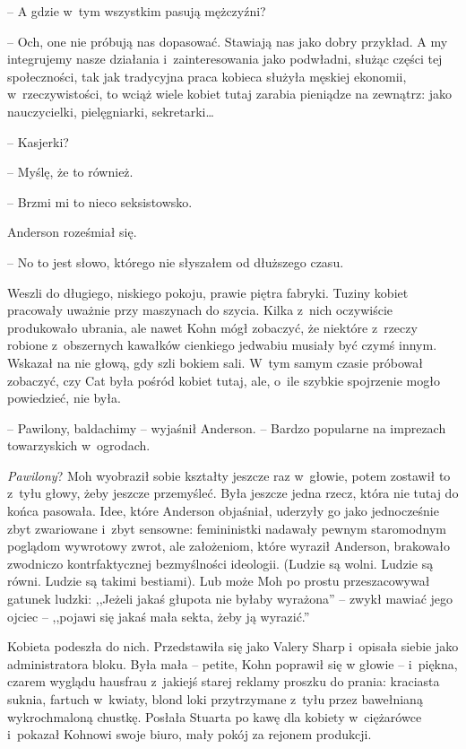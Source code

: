 \documentclass[oneside,polish,11pt,sfheadings]{mwbk}
\begin{document}
-- A gdzie w~tym wszystkim pasują mężczyźni?

-- Och, one nie próbują nas dopasować. Stawiają nas jako dobry przykład.
A my integrujemy nasze działania i~zainteresowania jako podwładni,
służąc części tej społeczności, tak jak tradycyjna praca kobieca służyła
męskiej ekonomii, w~rzeczywistości, to wciąż wiele kobiet tutaj zarabia
pieniądze na zewnątrz: jako nauczycielki, pielęgniarki, sekretarki\ldots

-- Kasjerki?

-- Myślę, że to również.

-- Brzmi mi to nieco seksistowsko.

Anderson roześmiał się. 

-- No to jest słowo, którego nie słyszałem od
dłuższego czasu.

Weszli do długiego, niskiego pokoju, prawie piętra fabryki. Tuziny
kobiet pracowały uważnie przy maszynach do szycia. Kilka z~nich
oczywiście produkowało ubrania, ale nawet Kohn mógł zobaczyć, że
niektóre z~rzeczy robione z~obszernych kawałków cienkiego jedwabiu
musiały być czymś innym. Wskazał na nie głową, gdy szli bokiem sali. W~tym samym czasie próbował zobaczyć, czy Cat była pośród kobiet tutaj,
ale, o~ile szybkie spojrzenie mogło powiedzieć, nie była.

-- Pawilony, baldachimy -- wyjaśnił Anderson. -- Bardzo popularne na
imprezach towarzyskich w~ogrodach.

\emph{Pawilony}? Moh wyobraził sobie kształty jeszcze raz w~głowie,
potem zostawił to z~tyłu głowy, żeby jeszcze przemyśleć. Była jeszcze
jedna rzecz, która nie tutaj do końca pasowała. Idee, które Anderson
objaśniał, uderzyły go jako jednocześnie zbyt zwariowane i~zbyt
sensowne: femininistki nadawały pewnym staromodnym poglądom wywrotowy
zwrot, ale założeniom, które wyraził Anderson, brakowało zwodniczo
kontrfaktycznej bezmyślności ideologii. (Ludzie są wolni. Ludzie są
równi. Ludzie są takimi bestiami). Lub może Moh po prostu przeszacowywał
gatunek ludzki: ,,Jeżeli jakaś głupota nie byłaby wyrażona'' -- zwykł
mawiać jego ojciec -- ,,pojawi się jakaś mała sekta, żeby ją wyrazić.''

Kobieta podeszła do nich. Przedstawiła się jako Valery Sharp i~opisała
siebie jako administratora bloku. Była mała -- petite, Kohn poprawił się
w głowie -- i~piękna, czarem wyglądu hausfrau z~jakiejś starej reklamy
proszku do prania: kraciasta suknia, fartuch w~kwiaty, blond loki
przytrzymane z~tyłu przez bawełnianą wykrochmaloną chustkę. Posłała
Stuarta po kawę dla kobiety w~ciężarówce i~pokazał Kohnowi swoje biuro,
mały pokój za rejonem produkcji.
\end{document}
